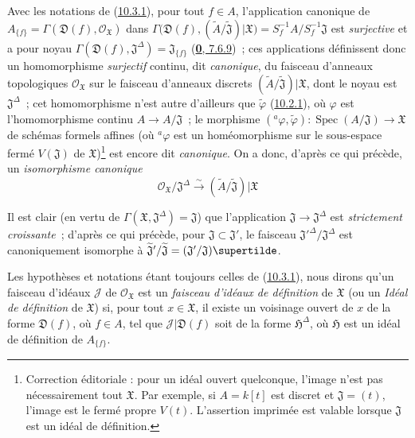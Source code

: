 \begin{env}[10.3.2]
\label{I.10.3.2-fr}
Avec les notations de (\hyperref[I.10.3.1-fr]{10.3.1}), pour tout $f\in A$,
l'application canonique de
$A_{\{f\}}=\Gamma(\mathfrak{D}(f),\mathscr{O}_{\mathfrak{X}})$ dans
$\Gamma\bigl(\mathfrak{D}(f),
(\widetilde{A}/\widetilde{\mathfrak{J}})|\mathfrak{X}\bigr)
=S_f^{-1}A/S_f^{-1}\mathfrak{J}$
est \emph{surjective} et a pour noyau
$\Gamma(\mathfrak{D}(f),\mathfrak{J}^\Delta)=\mathfrak{J}_{\{f\}}$
(\hyperref[0.7.6.9-fr]{\textbf{0}, 7.6.9})~; ces applications définissent donc un
homomorphisme \emph{surjectif} continu, dit \emph{canonique}, du faisceau
d'anneaux topologiques $\mathscr{O}_{\mathfrak{X}}$ sur le faisceau
d'anneaux discrets
$(\widetilde{A}/\widetilde{\mathfrak{J}})|\mathfrak{X}$, dont le noyau est
$\mathfrak{J}^\Delta$~; cet homomorphisme n'est autre d'ailleurs que
$\widetilde{\varphi}$ (\hyperref[I.10.2.1-fr]{10.2.1}), où $\varphi$ est
l'homomorphisme continu $A\to A/\mathfrak{J}$~; le morphisme
$({}^a\varphi,\widetilde{\varphi}):
\operatorname{Spec}(A/\mathfrak{J})\to\mathfrak{X}$ de schémas formels
affines (où ${}^a\varphi$ est un homéomorphisme sur le sous-espace fermé $V(\mathfrak{J})$ de $\mathfrak{X}$)\footnote{Correction éditoriale : pour un idéal ouvert quelconque, l'image n'est pas nécessairement tout $\mathfrak{X}$. Par exemple, si $A=k[t]$ est discret et $\mathfrak{J}=(t)$, l'image est le fermé propre $V(t)$. L'assertion imprimée est valable lorsque $\mathfrak{J}$ est un idéal de définition.} est encore dit \emph{canonique}. On a donc,
d'après ce qui précède, un \emph{isomorphisme canonique}
\[
  \mathscr{O}_{\mathfrak{X}}/\mathfrak{J}^\Delta
  \xrightarrow{\sim}
  (\widetilde{A}/\widetilde{\mathfrak{J}})|\mathfrak{X}
  \tag{10.3.2.1}\label{I.10.3.2.1-fr}
\]

Il est clair (en vertu de
$\Gamma(\mathfrak{X},\mathfrak{J}^\Delta)=\mathfrak{J}$) que
l'application $\mathfrak{J}\to\mathfrak{J}^\Delta$ est
\emph{strictement croissante}~; d'après ce qui précède, pour
$\mathfrak{J}\subset\mathfrak{J}'$, le faisceau
${\mathfrak{J}'}^\Delta/\mathfrak{J}^\Delta$ est canoniquement isomorphe à
$\widetilde{\mathfrak{J}}'/\widetilde{\mathfrak{J}}
=(\mathfrak{J}'/\mathfrak{J})\supertilde$.
\end{env}

\begin{env}[10.3.3]
\label{I.10.3.3-fr}
Les hypothèses et notations étant toujours celles de
(\hyperref[I.10.3.1-fr]{10.3.1}), nous dirons qu'un faisceau d'idéaux
$\mathscr{J}$ de $\mathscr{O}_{\mathfrak{X}}$ est un
\emph{faisceau d'idéaux de définition} de $\mathfrak{X}$ (ou un
\emph{Idéal de définition} de $\mathfrak{X}$) si, pour tout
$x\in\mathfrak{X}$, il existe un voisinage ouvert de $x$ de la forme
$\mathfrak{D}(f)$, où $f\in A$, tel que
$\mathscr{J}|\mathfrak{D}(f)$ soit de la forme $\mathfrak{H}^\Delta$, où
$\mathfrak{H}$ est un idéal de définition de $A_{\{f\}}$.
\end{env}

